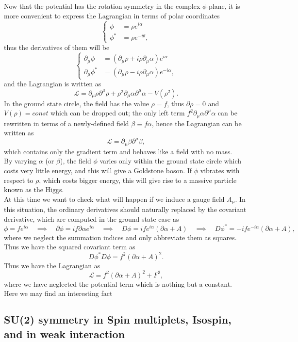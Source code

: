 \documentclass{article}
\newcommand{\be}{\begin{equation}}
\newcommand{\ee}{\end{equation}}
\newcommand{\p}{\partial}
\renewcommand{\1}{\left}
\renewcommand{\2}{\right}
\newcommand{\ma}{\mathcal}
\newcommand{\rar}{\quad\implies\quad}
\newcommand{\m}{\mu}
\newcommand{\al}{\alpha}
\newcommand{\bet}{\beta}
\renewcommand{\th}{\theta}
\begin{document}
Now that the potential has the rotation symmetry in the complex $\phi$-plane, it is more convenient to express the Lagrangian in terms of polar coordinates
\be\1\{\begin{split}
\phi&=\rho e^{i\al} \\
\phi^*&=\rho e^{-i\th},
\end{split}\2.\ee
thus the derivatives of them will be
\be\1\{\begin{split}
\p_\m\phi&=\1(\p_\m \rho+i\rho\p_\m\al\2)e^{i\al} \\
\p_\m\phi^*&=\1(\p_\m \rho-i\rho\p_\m\al\2)e^{-i\al},
\end{split}\2.\ee
and the Lagrangian is written as
\be
\ma L=\p_\m\rho\p^\m\rho+\rho^2\p_\m\al\p^\m\al-V(\rho^2).
\ee
In the ground state circle, the field has the value $\rho=f$, thus $\p\rho=0$ and $V(\rho)=const$ which can be dropped out; the only left term $f^2\p_\m\al\p^\m\al$ can be rewritten in terms of a newly-defined field $\bet\equiv f\al$, hence the Lagrangian can be written as
\be \ma L=\p_\m\bet\p^\m\bet, \ee
which contains only the gradient term and behaves like a field with no mass.\\
By varying $\al$ (or $\bet$), the field $\phi$ varies only within the ground state circle which costs very little energy, and this will give a Goldstone boson. If $\phi$ vibrates with respect to $\rho$, which costs bigger energy, this will give rise to a massive particle known as the Higgs.\\
At this time we want to check what will happen if we induce a gauge field $A_\m$. In this situation, the ordinary derivatives should naturally replaced by the covariant derivative, which are computed in the ground state case as
\be
\phi=fe^{i\al} \rar \p\phi=if\p\al e^{i\al} \rar D\phi=ife^{i\al}(\p\al+A) \rar D\phi^*=-ife^{-i\al}(\p\al+A),
\ee
where we neglect the summation indices and only abbreviate them as squares. Thus we have the squared covariant term as
\be D\phi^*D\phi=f^2 (\p\al+A)^2. \ee
Thus we have the Lagrangian as 
\be
\ma L=f^2 (\p\al+A)^2+F^2,
\ee
where we have neglected the potential term which is nothing but a constant.\\
Here we may find an interesting fact




\subsection{SU(2) symmetry in Spin multiplets, Isospin, and in weak interaction}
\end{document}
